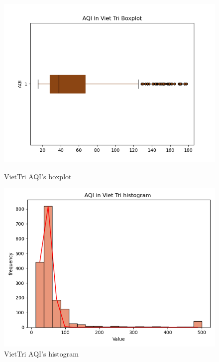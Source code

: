\documentclass[conference]{IEEEtran}
\begin{document}
\begin{figure}[H]
    \centering
    \begin{minipage}{0.24\textwidth}
        \centering
        \includegraphics[width=1\textwidth]{bibliography/figure/Analysis-Dataset/BoxplotVietTri.png}
        \caption{VietTri AQI's boxplot}
        \label{fig:5}
    \end{minipage}
    \hfill
    \begin{minipage}{0.24\textwidth}
        \centering
        \includegraphics[width=1\textwidth]{bibliography/figure/Analysis-Dataset/histogramVietTri.png}
        \caption{VietTri AQI's histogram}
        \label{fig:6}
    \end{minipage}
\end{figure}
\end{document}
